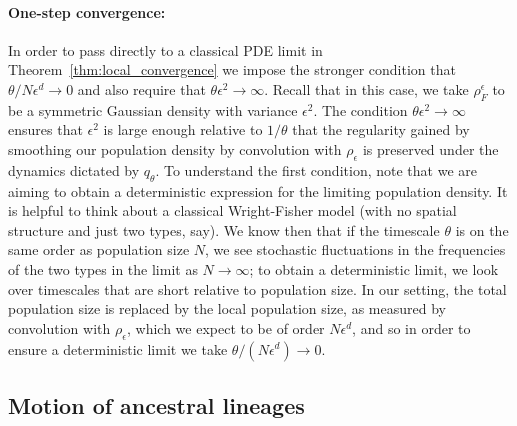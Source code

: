 \documentclass[EJP]{ejpecp} %
\begin{document}
\paragraph{One-step convergence:}
In order to pass directly to a classical PDE limit
in Theorem~\ref{thm:local_convergence}
we impose the stronger condition
that $\theta/N\epsilon^d\to 0$ and also require that
$\theta\epsilon^2\to\infty$. 
Recall that in this case, we take $\rho_F^\epsilon$ 
to be a symmetric Gaussian density with variance 
$\epsilon^2$. The condition $\theta\epsilon^2\to\infty$ 
ensures that $\epsilon^2$ is large enough relative to $1/\theta$
that the regularity gained by smoothing our population density by convolution with
$\rho_\epsilon$ is preserved under the dynamics dictated by $q_{\theta}$.
To understand the first condition, note that we are aiming to obtain a 
deterministic expression for the limiting population density. 
It is helpful to think
about a classical Wright-Fisher model (with no spatial structure and just two types, say). 
We know then that if the
timescale $\theta$ is on the same order as population size $N$, we see stochastic
fluctuations in the frequencies of the two types in the limit as $N\to\infty$; to 
obtain a deterministic limit, we look over timescales that are short relative to population
size. In our setting, the total population size is replaced by the local population
size, as measured by convolution with $\rho_{\epsilon}$, which we expect to be 
of order $N\epsilon^d$, and so in order to ensure a deterministic limit we 
take $\theta/(N\epsilon^d)\to 0$.


\subsection{Motion of ancestral lineages}
\label{sec:lineage_motion}
\end{document}
